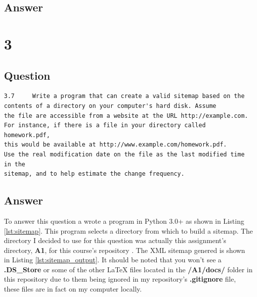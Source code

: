 \documentclass[letterpaper,11pt]{article}
\newcommand*{\srcPath}{../src}%
\begin{document}
\subsection*{Answer}



\clearpage


\section*{3}

\subsection*{Question}

\begin{verbatim}
3.7 	Write a program that can create a valid sitemap based on the 
contents of a directory on your computer's hard disk. Assume 
the file are accessible from a website at the URL http://example.com. 
For instance, if there is a file in your directory called homework.pdf, 
this would be available at http://www.example.com/homework.pdf. 
Use the real modification date on the file as the last modified time in the 
sitemap, and to help estimate the change frequency.
\end{verbatim}

\subsection*{Answer}

To answer this question a wrote a program in Python 3.0+ as shown in Listing \ref{lst:sitemap}. 
This program selects a directory from which to build a sitemap.
The directory I decided to use for this question was actually this assignment's directory, \textbf{A1}, for this course's repository \cite{github}.
The XML sitemap genered is shown in Listing \ref{lst:sitemap_output}. 
It should be noted that you won't see a \textbf{.DS\_Store} or some of the other LaTeX files located in the \textbf{/A1/docs/} folder in this 
repository due to them being ignored in my repository's \textbf{.gitignore} file, these files are in fact on my computer locally. 


 
\end{document}
